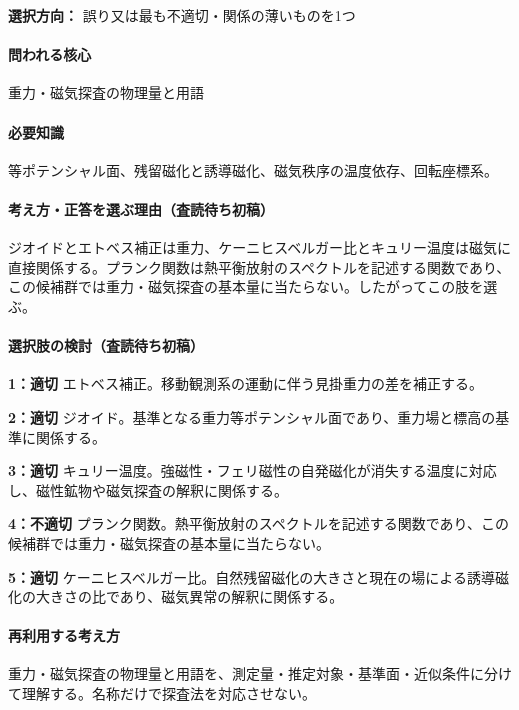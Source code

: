 \noindent\textbf{選択方向：} 誤り又は最も不適切・関係の薄いものを1つ\par

\paragraph{問われる核心} 重力・磁気探査の物理量と用語

\paragraph{必要知識} 等ポテンシャル面、残留磁化と誘導磁化、磁気秩序の温度依存、回転座標系。

\paragraph{考え方・正答を選ぶ理由（査読待ち初稿）} ジオイドとエトベス補正は重力、ケーニヒスベルガー比とキュリー温度は磁気に直接関係する。プランク関数は熱平衡放射のスペクトルを記述する関数であり、この候補群では重力・磁気探査の基本量に当たらない。したがってこの肢を選ぶ。

\paragraph{選択肢の検討（査読待ち初稿）}\mbox{}\par

\noindent\textbf{1：適切} エトベス補正。移動観測系の運動に伴う見掛重力の差を補正する。\par

\noindent\textbf{2：適切} ジオイド。基準となる重力等ポテンシャル面であり、重力場と標高の基準に関係する。\par

\noindent\textbf{3：適切} キュリー温度。強磁性・フェリ磁性の自発磁化が消失する温度に対応し、磁性鉱物や磁気探査の解釈に関係する。\par

\noindent\textbf{4：不適切} プランク関数。熱平衡放射のスペクトルを記述する関数であり、この候補群では重力・磁気探査の基本量に当たらない。\par

\noindent\textbf{5：適切} ケーニヒスベルガー比。自然残留磁化の大きさと現在の場による誘導磁化の大きさの比であり、磁気異常の解釈に関係する。\par

\paragraph{再利用する考え方} 重力・磁気探査の物理量と用語を、測定量・推定対象・基準面・近似条件に分けて理解する。名称だけで探査法を対応させない。

